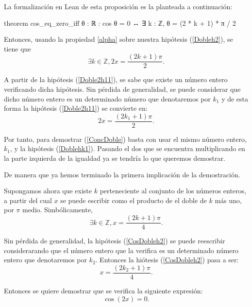 \begin{demostracion}
  La formalización en Lean de esta proposición es la planteada
  a continuación:
  \begin{leancode}
    theorem cos_eq_zero_iff
      {θ : ℝ}
      : cos θ = 0 ↔ ∃ k : ℤ, θ = (2 * k + 1) * π / 2
  \end{leancode}

  Entonces, usando la propiedad \ref{alpha} sobre nuestra hipótesis
  (\ref{Dobleh2}), se tiene que
  \begin{equation}\label{Doble2h11}
    ∃k ∈ ℤ, 2x = \frac{(2k+1)π}{2}.
  \end{equation}

  A partir de la hipótesis (\ref{Doble2h11}), se sabe que existe un
  número entero verificando dicha hipótesis. Sin pérdida de generalidad,
  se puede considerar que dicho número entero es un determinado número
  que denotaremos por \(k_1\) y de esta forma la hipótesis
  (\ref{Doble2h11}) se convierte en:
  \begin{equation}\label{Doblehk1}\tag{hk1}
     2x = \frac{(2k_1+1)π}{2}.
  \end{equation}

  Por tanto, para demostrar (\ref{ConcDoble}) basta con usar el mismo
  número entero, \(k_1\), y la hipótesis (\ref{Doblehk1}). Pasando el
  dos que se encuentra multiplicando en la parte izquierda de la
  igualdad ya se tendría lo que queremos demostrar.

  De manera que ya hemos terminado la primera implicación de la
  demostración.

   \noindent
   \framebox{\longleftarrow} Supongamos ahora que existe \(k\)
   perteneciente al conjunto de los números enteros, a partir del cual
   \(x\) se puede escribir como el producto de el doble de \(k \) más
   uno, por \( π\) medio. Simbólicamente,
   \begin{equation}\label{CosDobleh2}\tag{h2}
      ∃ k ∈ ℤ, x = \frac{(2k+1)π}{4}.
    \end{equation}

    Sin pérdida de generalidad, la hipótesis (\ref{CosDobleh2}) se puede
    reescribir considerarando que el número entero que la verifica es un
    determinado número entero que denotaremos por \(k_2\).  Entonces la
    hiótesis (\ref{CosDobleh2}) pasa a ser:
    \begin{equation}\label{hk2}\tag{hk2}
       x = \frac{(2k_2+1)π}{4}.
    \end{equation}

    Entonces se quiere demostrar que se verifica la siguiente expresión:
    \begin{equation}\label{ConcDoble3}
      \cos(2x) = 0.
    \end{equation}


\end{demostracion}
